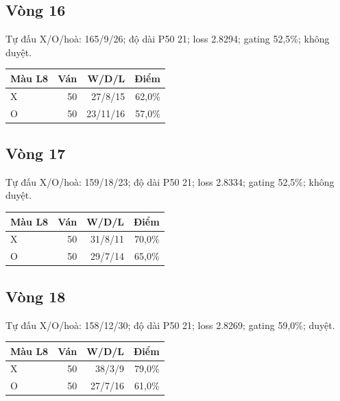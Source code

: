 \subsection*{Vòng 16}

Tự đấu X/O/hoà: 165/9/26; độ dài P50 21; loss 2.8294; gating 52,5\%; không duyệt.

\begin{center}\scriptsize\begin{tabular}{@{}lrrr@{}}\toprule

Màu L8 & Ván & W/D/L & Điểm \\

\midrule

X & 50 & 27/8/15 & 62,0\% \\

O & 50 & 23/11/16 & 57,0\% \\

\bottomrule\end{tabular}\end{center}

\subsection*{Vòng 17}

Tự đấu X/O/hoà: 159/18/23; độ dài P50 21; loss 2.8334; gating 52,5\%; không duyệt.

\begin{center}\scriptsize\begin{tabular}{@{}lrrr@{}}\toprule

Màu L8 & Ván & W/D/L & Điểm \\

\midrule

X & 50 & 31/8/11 & 70,0\% \\

O & 50 & 29/7/14 & 65,0\% \\

\bottomrule\end{tabular}\end{center}

\subsection*{Vòng 18}

Tự đấu X/O/hoà: 158/12/30; độ dài P50 21; loss 2.8269; gating 59,0\%; duyệt.

\begin{center}\scriptsize\begin{tabular}{@{}lrrr@{}}\toprule

Màu L8 & Ván & W/D/L & Điểm \\

\midrule

X & 50 & 38/3/9 & 79,0\% \\

O & 50 & 27/7/16 & 61,0\% \\

\bottomrule\end{tabular}\end{center}

